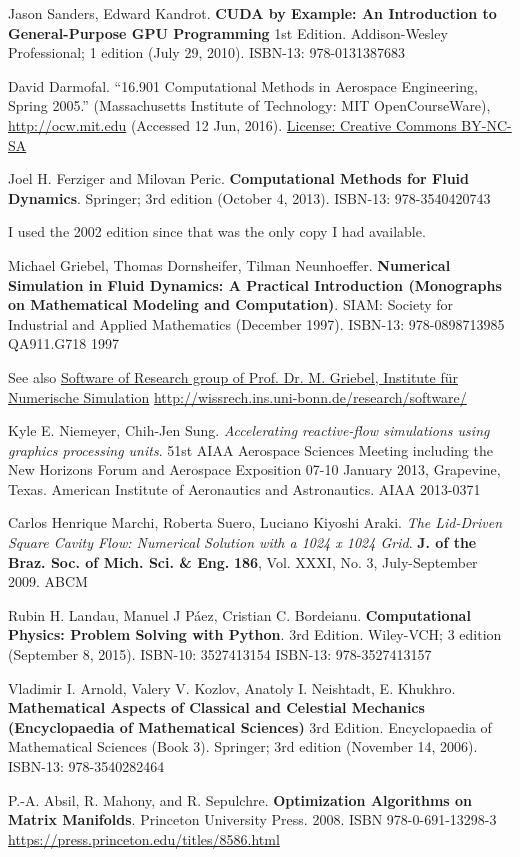 \documentclass[10pt]{amsart}
\begin{document}
\begin{thebibliography}{9}
Jason Sanders, Edward Kandrot.  \textbf{CUDA by Example: An Introduction to General-Purpose GPU Programming} 1st Edition.  Addison-Wesley Professional; 1 edition (July 29, 2010).  ISBN-13: 978-0131387683

  David Darmofal. ``16.901 Computational Methods in Aerospace Engineering, Spring 2005.'' (Massachusetts Institute of Technology: MIT OpenCourseWare), \url{http://ocw.mit.edu} (Accessed 12 Jun, 2016). \href{http://creativecommons.org/licenses/by-nc-sa/4.0/}{License: Creative Commons BY-NC-SA}

Joel H. Ferziger and Milovan Peric.  \textbf{Computational Methods for Fluid Dynamics}.  Springer; 3rd edition (October 4, 2013).  ISBN-13: 978-3540420743

I used the 2002 edition since that was the only copy I had available.  

Michael Griebel, Thomas Dornsheifer, Tilman Neunhoeffer.  \textbf{Numerical Simulation in Fluid Dynamics: A Practical Introduction (Monographs on Mathematical Modeling and Computation)}.  SIAM: Society for Industrial and Applied Mathematics (December 1997).  ISBN-13: 978-0898713985  QA911.G718  1997
  
See also \href{http://wissrech.ins.uni-bonn.de/research/software/}{Software of Research group of Prof. Dr. M. Griebel, Institute f\"{u}r Numerische Simulation} \url{http://wissrech.ins.uni-bonn.de/research/software/}

Kyle E. Niemeyer, Chih-Jen Sung.  \emph{Accelerating reactive-flow simulations using graphics processing units}.  51st AIAA Aerospace Sciences Meeting including the New Horizons Forum and Aerospace Exposition 07-10 January 2013, Grapevine, Texas. American Institute of Aeronautics and Astronautics.  AIAA 2013-0371

  Carlos Henrique Marchi, Roberta Suero, Luciano Kiyoshi Araki.  \emph{The Lid-Driven Square Cavity Flow: Numerical Solution with a 1024 x 1024 Grid}.  \textbf{J. of the Braz. Soc. of Mich. Sci. \& Eng.}  \textbf{186}, Vol. XXXI, No. 3, July-September 2009.  ABCM

Rubin H. Landau, Manuel J P\'{a}ez, Cristian C. Bordeianu.  \textbf{Computational Physics: Problem Solving with Python}.  3rd Edition.  Wiley-VCH; 3 edition (September 8, 2015).  ISBN-10: 3527413154  ISBN-13: 978-3527413157


Vladimir I. Arnold, Valery V. Kozlov, Anatoly I. Neishtadt, E. Khukhro.  \textbf{Mathematical Aspects of Classical and Celestial Mechanics (Encyclopaedia of Mathematical Sciences)} 3rd Edition.  Encyclopaedia of Mathematical Sciences (Book 3).  Springer; 3rd edition (November 14, 2006).  ISBN-13: 978-3540282464

P.-A. Absil, R. Mahony, and R. Sepulchre.  \textbf{Optimization Algorithms on Matrix Manifolds}.  Princeton University Press.  2008.  ISBN 978-0-691-13298-3
\url{https://press.princeton.edu/titles/8586.html}  




  
\end{thebibliography}
\end{document}
